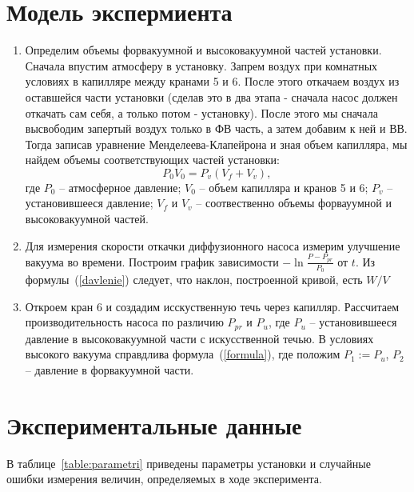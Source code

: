 \documentclass[a4paper,12pt]{article} %
\begin{document}
\section{Модель экспермиента}
\begin{enumerate}
\item
	Определим объемы форвакуумной и высоковакуумной частей установки. Сначала впустим атмосферу в установку. Запрем воздух при комнатных условиях в капилляре между кранами 5 и 6. После этого откачаем воздух из оставшейся части установки (сделав это в два этапа - сначала насос должен откачать сам себя, а только потом - установку). После этого мы сначала высвободим запертый воздух только в ФВ часть, а затем добавим к ней и ВВ. Тогда записав уравнение Менделеева-Клапейрона и зная объем капилляра, мы найдем объемы соответствующих частей установки:
\begin{equation}
	P_0 V_0 = P_v (V_f + V_v),
\end{equation}
где $P_0$ -- атмосферное давление; $V_0$ -- объем капилляра и кранов 5 и 6; $P_v$ -- установившееся давление; $V_f$ и $V_v$ -- соотвественно объемы форвауумной и высоковакуумной частей.
	
\item
	Для измерения скорости откачки диффузионного насоса измерим улучшение вакуума во времени. Построим график зависимости $-\ln{\frac{P-P_{pr}}{P_0}}$ от $t$. Из формулы~(\ref{davlenie}) следует, что наклон, построенной кривой, есть $W / V$

\item
	Откроем кран 6 и создадим исскуственную течь через капилляр. Рассчитаем производительность насоса по различию $P_{pr}$ и $P_u$, где $P_u$ -- установившееся давление в высоковакуумной части с искусственной течью. В условиях высокого вакуума справдлива формула~(\ref{formula}), где положим $P_1 := P_u$, $P_2$ -- давление в форвакуумной части. 


\end{enumerate}
\section{Экспериментальные данные}
	В таблице~\ref{table:parametri} приведены параметры установки и случайные ошибки измерения величин, определяемых в ходе эксперимента.
	
\end{document}
